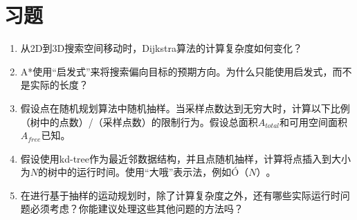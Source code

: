 \section*{习题}\small
\begin{enumerate}



\item 从2D到3D搜索空间移动时，Dijkstra算法的计算复杂度如何变化？
\item A*使用“启发式”来将搜索偏向目标的预期方向。为什么只能使用启发式，而不是实际的长度？
\item 假设点在随机规划算法中随机抽样。当采样点数达到无穷大时，计算以下比例（树中的点数）/（采样点数）的限制行为。假设总面积$A_{total}$和可用空间面积$A_{free}$已知。

\item 假设使用kd-tree作为最近邻数据结构，并且点随机抽样，计算将点插入到大小为$N$的树中的运行时间。使用“大哦”表示法，例如$\mathcal{Ó}（N）$。

\item 在进行基于抽样的运动规划时，除了计算复杂度之外，还有哪些实际运行时问题必须考虑？你能建议处理这些其他问题的方法吗？

\end{enumerate}

\normalsize